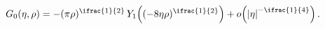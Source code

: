 \[\mathop{G_{0}\/}\nolimits\!\left(\eta,\rho\right)=-(\pi\rho)^{\ifrac{1}{2}}%
\mathop{Y_{1}\/}\nolimits\!\left((-8\eta\rho)^{\ifrac{1}{2}}\right)+\mathop{o%
\/}\nolimits\!\left(\left|\eta\right|^{-\ifrac{1}{4}}\right).\]